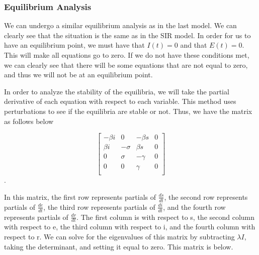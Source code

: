 \documentclass[12pt, a4paper]{article}
\begin{document}
        
        \subsubsection{Equilibrium Analysis}
        
        We can undergo a similar equilibrium analysis as in the last model. We can clearly see that the situation is the same as in the SIR model. In order for us to have an equilibrium point, we must have that $I(t)=0$ and that $E(t)=0$. This will make all equations go to zero. If we do not have these conditions met, we can clearly see that there will be some equations that are not equal to zero, and thus we will not be at an equilibrium point.
        
        In order to analyze the stability of the equilibria, we will take the partial derivative of each equation with respect to each variable. This method uses perturbations to see if the equilibria are stable or not. Thus, we have the matrix as follows below
        
        $$\begin{bmatrix}
            -\beta i & 0 & -\beta s & 0 \\
            \beta i & -\sigma & \beta s & 0 \\
            0 & \sigma & -\gamma & 0 \\
            0 & 0 & \gamma & 0 \\
        \end{bmatrix}$$.
        
        In this matrix, the first row represents partials of $\frac{ds}{dt}$, the second row represents partials of $\frac{de}{dt}$, the third row represents partials of $\frac{di}{dt}$, and the fourth row represents partials of $\frac{dr}{dt}$. The first column is with respect to s, the second column with respect to e, the third column with respect to i, and the fourth column with respect to r. We can solve for the eigenvalues of this matrix by subtracting $\lambda I$, taking the determinant, and setting it equal to zero. This matrix is below.
        
\end{document}
